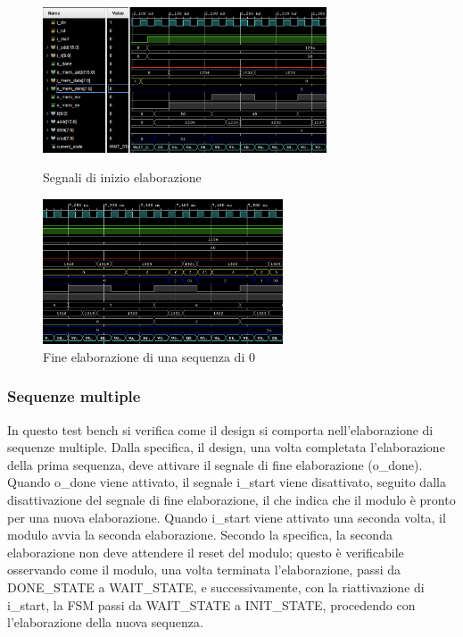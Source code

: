 \documentclass[11pt,a4paper]{article}
\begin{document}
\vspace{0.5em}
\begin{figure}[htbp]
    \centering
    \begin{minipage}{0.53\textwidth}
        \centering
        \includegraphics[height=4.3cm]{resources/value_0_start.png}
        \caption{Segnali di inizio elaborazione}
        \label{fig:value_0_start}
    \end{minipage}\hfill
    \begin{minipage}{0.47\textwidth}
        \centering
        \includegraphics[height=4.3cm]{resources/value_0_mid.png}
        \caption{Fine elaborazione di una sequenza di 0}
        \label{fig:value_0_mid}
    \end{minipage}
    \label{fig:value_0_sequence}
\end{figure}
\subsubsection{Sequenze multiple}

In questo test bench si verifica come il design si comporta nell'elaborazione di sequenze multiple. Dalla specifica, il design, una volta completata l'elaborazione della prima sequenza, deve attivare il segnale di fine elaborazione (o\_done). Quando o\_done viene attivato, il segnale i\_start viene disattivato, seguito dalla disattivazione del segnale di fine elaborazione, il che indica che il modulo è pronto per una nuova elaborazione. Quando i\_start viene attivato una seconda volta, il modulo avvia la seconda elaborazione. Secondo la specifica, la seconda elaborazione non deve attendere il reset del modulo; questo è verificabile osservando come il modulo, una volta terminata l'elaborazione, passi da DONE\_STATE a WAIT\_STATE, e successivamente, con la riattivazione di i\_start, la FSM passi da WAIT\_STATE a INIT\_STATE, procedendo con l'elaborazione della nuova sequenza.
\end{document}
